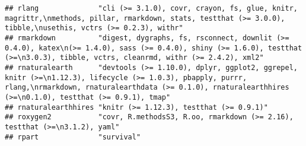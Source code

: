 \documentclass[
]{article}
\begin{document}
\begin{verbatim}
## rlang              "cli (>= 3.1.0), covr, crayon, fs, glue, knitr, magrittr,\nmethods, pillar, rmarkdown, stats, testthat (>= 3.0.0), tibble,\nusethis, vctrs (>= 0.2.3), withr"                                                                                                                                                                                                                                                                                                                     
## rmarkdown          "digest, dygraphs, fs, rsconnect, downlit (>= 0.4.0), katex\n(>= 1.4.0), sass (>= 0.4.0), shiny (>= 1.6.0), testthat (>=\n3.0.3), tibble, vctrs, cleanrmd, withr (>= 2.4.2), xml2"                                                                                                                                                                                                                                                                                                
## rnaturalearth      "devtools (>= 1.10.0), dplyr, ggplot2, ggrepel, knitr (>=\n1.12.3), lifecycle (>= 1.0.3), pbapply, purrr, rlang,\nrmarkdown, rnaturalearthdata (>= 0.1.0), rnaturalearthhires (>=\n0.1.0), testthat (>= 0.9.1), tmap"                                                                                                                                                                                                                                                             
## rnaturalearthhires "knitr (>= 1.12.3), testthat (>= 0.9.1)"                                                                                                                                                                                                                                                                                                                                                                                                                                          
## roxygen2           "covr, R.methodsS3, R.oo, rmarkdown (>= 2.16), testthat (>=\n3.1.2), yaml"                                                                                                                                                                                                                                                                                                                                                                                                        
## rpart              "survival"                                                                                                                                                                                                                                                                                                                                                                                                                                                                        

\end{verbatim}
\end{document}
